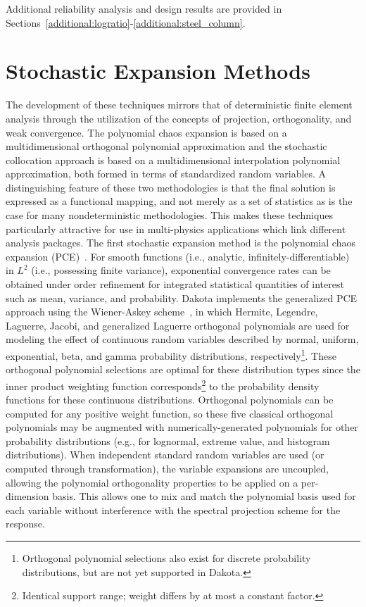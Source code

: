 Additional reliability analysis and design results are provided in 
Sections~\ref{additional:logratio}-\ref{additional:steel_column}.


\section{Stochastic Expansion Methods}\label{uq:expansion}


The development of these techniques mirrors that of deterministic
finite element analysis through the utilization of the concepts of
projection, orthogonality, and weak convergence. The polynomial chaos
expansion is based on a multidimensional orthogonal polynomial
approximation and the stochastic collocation approach is based on a
multidimensional interpolation polynomial approximation, both formed
in terms of standardized random variables. A distinguishing feature of
these two methodologies is that the final solution is expressed as a
functional mapping, and not merely as a set of statistics as is the
case for many nondeterministic methodologies.  This makes these
techniques particularly attractive for use in multi-physics
applications which link different analysis packages.  The first
stochastic expansion method is the polynomial chaos expansion
(PCE)~\cite{Gha99,Gha91}. For smooth functions (i.e.,
analytic, infinitely-differentiable) in $L^2$ (i.e., possessing finite
variance), exponential convergence rates can be obtained under order
refinement for integrated statistical quantities of interest such as
mean, variance, and probability. Dakota implements the generalized
PCE approach using the Wiener-Askey
scheme~\cite{XiuKarn02}, in which Hermite, Legendre, Laguerre, Jacobi,
and generalized Laguerre orthogonal polynomials are used for modeling
the effect of continuous random variables described by normal,
uniform, exponential, beta, and gamma probability distributions,
respectively\footnote{Orthogonal polynomial selections also exist for
  discrete probability distributions, but are not yet supported in
  Dakota.}. These orthogonal polynomial selections are optimal for
these distribution types since the inner product weighting function
corresponds\footnote{Identical support range; weight differs by at
  most a constant factor.} to the probability density functions for
these continuous distributions. Orthogonal polynomials can be computed
for any positive weight function, so these five classical orthogonal
polynomials may be augmented with numerically-generated polynomials
for other probability distributions (e.g., for lognormal, extreme
value, and histogram distributions).  When independent standard random
variables are used (or computed through transformation), the variable
expansions are uncoupled, allowing the polynomial orthogonality
properties to be applied on a per-dimension basis. This allows one to
mix and match the polynomial basis used for each variable without
interference with the spectral projection scheme for the response.

